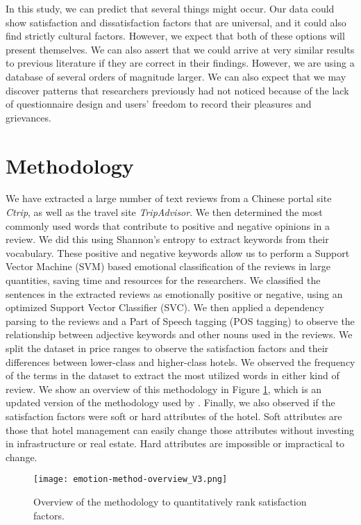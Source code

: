 \documentclass[smallextended,natbib]{svjour3}       %
\begin{document}
    In this study, we can predict that several things might occur. Our data could show satisfaction and dissatisfaction factors that are universal, and it could also find strictly cultural factors. However, we expect that both of these options will present themselves. We can also assert that we could arrive at very similar results to previous literature if they are correct in their findings. However, we are using a database of several orders of magnitude larger. We can also expect that we may discover patterns that researchers previously had not noticed because of the lack of questionnaire design and users' freedom to record their pleasures and grievances.


\section{Methodology}\label{method}

  We have extracted a large number of text reviews from a Chinese portal site \textit{Ctrip}, as well as the travel site \textit{TripAdvisor}. We then determined the most commonly used words that contribute to positive and negative opinions in a review. We did this using Shannon's entropy to extract keywords from their vocabulary. These positive and negative keywords allow us to perform a Support Vector Machine (SVM) based emotional classification of the reviews in large quantities, saving time and resources for the researchers. We classified the sentences in the extracted reviews as emotionally positive or negative, using an optimized Support Vector Classifier (SVC). We then applied a dependency parsing to the reviews and a Part of Speech tagging (POS tagging) to observe the relationship between adjective keywords and other nouns used in the reviews. We split the dataset in price ranges to observe the satisfaction factors and their differences between lower-class and higher-class hotels. We observed the frequency of the terms in the dataset to extract the most utilized words in either kind of review. We show an overview of this methodology in Figure \ref{fig:method-overview}, which is an updated version of the methodology used by \cite{Aleman2018ICAROB}. Finally, we also observed if the satisfaction factors were soft or hard attributes of the hotel. Soft attributes are those that hotel management can easily change those attributes without investing in infrastructure or real estate. Hard attributes are impossible or impractical to change.

  \begin{figure}[bp]
  \centering
  \texttt{[image: emotion-method-overview\_V3.png]}
  \caption{Overview of the methodology to quantitatively rank satisfaction factors.}
  \label{fig:method-overview}
  \end{figure}
\end{document}
